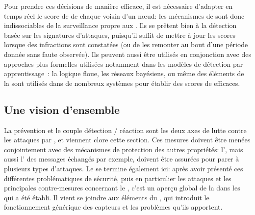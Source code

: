 Pour prendre ces décisions de manière efficace, il est nécessaire d'adapter en temps réel le score de \reput de chaque voisin d'un nœud: les mécanismes de  sont donc indissociables de la surveillance propre aux \IDS.
Ils se prêtent bien à la détection basée sur les signatures d'attaques, puisqu'il suffit de mettre à jour les scores lorsque des infractions sont constatées (ou de les remonter au bout d'une période donnée sans faute observée).
Ils peuvent aussi être utilisés en conjonction avec des approches plus formelles utilisées notamment dans les modèles de détection par apprentissage~\cite{F-GRL07,MC10}: la logique floue, les réseaux bayésiens, ou même des éléments de la  sont utilisés dans de nombreux systèmes pour établir des scores de  efficaces.

\subsection{Une vision d'ensemble}
La prévention et le couple détection / réaction sont les deux axes de lutte contre les attaques par \dds, et viennent clore cette section.
Ces mesures doivent être menées conjointement avec des mécanismes de protection des autres propriétés: l', mais aussi l' des messages échangés par exemple, doivent être assurées pour parer à plusieurs types d'attaques.
Le  se termine également ici: après avoir présenté ces différentes problématiques de sécurité, puis en particulier les attaques et les principales contre-mesures concernant le \dds, c'est un aperçu global de la \secu dans les \rcs qui a été établi.
Il vient se joindre aux éléments du , qui introduit le fonctionnement générique des capteurs et les problèmes qu'ils apportent.

